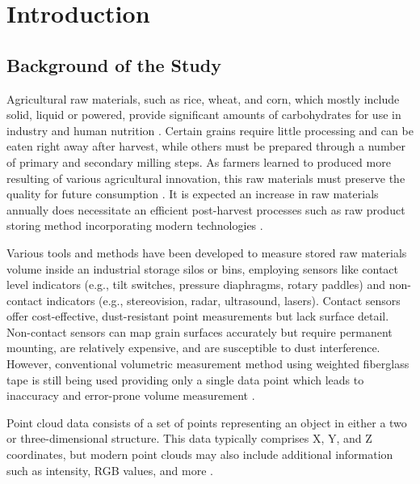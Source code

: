 \renewcommand{\thechapter}{\Roman{chapter}}
\chapter{Introduction}
\renewcommand{\thechapter}{\arabic{chapter}}
\label{ch:Introduction}
\thispagestyle{empty}

\section{Background of the Study}
\label{intro:sec:Background of the Study}

Agricultural raw materials, such as rice, wheat, and corn, which mostly include solid, liquid or powered, provide significant amounts of carbohydrates for use in industry and human nutrition . Certain grains require little processing and can be eaten right away after harvest, while others must be prepared through a number of primary and secondary milling steps. As farmers learned to produced more resulting of various agricultural innovation, this raw materials must preserve the quality for future consumption \citep{Bucklin2019175}.
It is expected an increase in raw materials annually does necessitate an efficient post-harvest processes such as raw product storing method incorporating modern technologies \citep{Kumar2017-jl,yegorova_2021,Joni2022}.

Various tools and methods have been developed to measure stored raw materials volume inside an industrial storage silos or bins, employing sensors like contact level indicators (e.g., tilt switches, pressure diaphragms, rotary paddles) and non-contact indicators (e.g., stereovision, radar, ultrasound, lasers). Contact sensors offer cost-effective, dust-resistant point measurements but lack surface detail. Non-contact sensors can map grain surfaces accurately but require permanent mounting, are relatively expensive, and are susceptible to dust interference. However, conventional volumetric measurement method using weighted fiberglass tape is still being used providing only a single data point which leads to inaccuracy and error-prone volume measurement \citep{turner2016,turner2017}.

Point cloud data consists of a set of points representing an object in either a two or three-dimensional structure. This data typically comprises X, Y, and Z coordinates, but modern point clouds may also include additional information such as intensity, RGB values, and more \citep{wang2019306, stojanovic2023point}.

